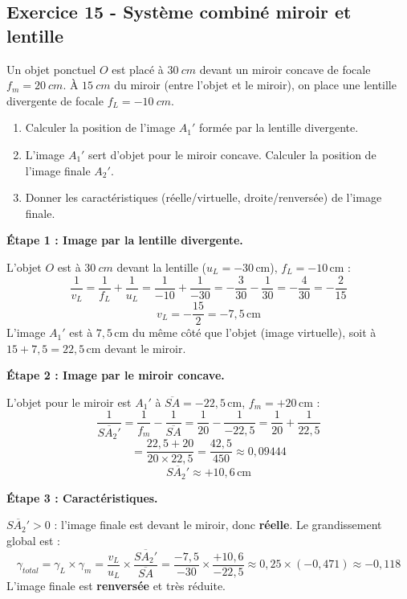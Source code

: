 \documentclass[12pt,a4paper]{article}
\begin{document}
\subsection*{Exercice 15 - Système combiné miroir et lentille \niveau{\difficile}}

\begin{boiteexercice}
Un objet ponctuel $O$ est placé à $\qty{30}{cm}$ devant un miroir concave de focale $f_m = \qty{20}{cm}$. À $\qty{15}{cm}$ du miroir (entre l'objet et le miroir), on place une lentille divergente de focale $f_L = -\qty{10}{cm}$.
\begin{enumerate}
  \item Calculer la position de l'image $A_1'$ formée par la lentille divergente.
  \item L'image $A_1'$ sert d'objet pour le miroir concave. Calculer la position de l'image finale $A_2'$.
  \item Donner les caractéristiques (réelle/virtuelle, droite/renversée) de l'image finale.
\end{enumerate}
\end{boiteexercice}

\begin{boitecorrige}
\textbf{Étape 1 : Image par la lentille divergente.}

L'objet $O$ est à $\qty{30}{cm}$ devant la lentille ($u_L = -30\,\text{cm}$), $f_L = -10\,\text{cm}$ :
\[
\frac{1}{v_L} = \frac{1}{f_L} + \frac{1}{u_L} = \frac{1}{-10} + \frac{1}{-30} = -\frac{3}{30} - \frac{1}{30} = -\frac{4}{30} = -\frac{2}{15}
\]
\[
v_L = -\frac{15}{2} = -7{,}5\,\text{cm}
\]
L'image $A_1'$ est à $7{,}5\,\text{cm}$ du même côté que l'objet (image virtuelle), soit à $15 + 7{,}5 = 22{,}5\,\text{cm}$ devant le miroir.

\textbf{Étape 2 : Image par le miroir concave.}

L'objet pour le miroir est $A_1'$ à $\overline{SA} = -22{,}5\,\text{cm}$, $f_m = +20\,\text{cm}$ :
\[
\frac{1}{\overline{SA_2'}} = \frac{1}{f_m} - \frac{1}{\overline{SA}} = \frac{1}{20} - \frac{1}{-22{,}5} = \frac{1}{20} + \frac{1}{22{,}5}
\]
\[
= \frac{22{,}5 + 20}{20 \times 22{,}5} = \frac{42{,}5}{450} \approx 0{,}09444
\]
\[
\overline{SA_2'} \approx +10{,}6\,\text{cm}
\]

\textbf{Étape 3 : Caractéristiques.}

$\overline{SA_2'} > 0$ : l'image finale est devant le miroir, donc \textbf{réelle}. Le grandissement global est :
\[
\gamma_{total} = \gamma_L \times \gamma_m = \frac{v_L}{u_L} \times \frac{\overline{SA_2'}}{\overline{SA}} = \frac{-7{,}5}{-30} \times \frac{+10{,}6}{-22{,}5} \approx 0{,}25 \times (-0{,}471) \approx -0{,}118
\]
L'image finale est \textbf{renversée} et très réduite.
\end{boitecorrige}
\end{document}
